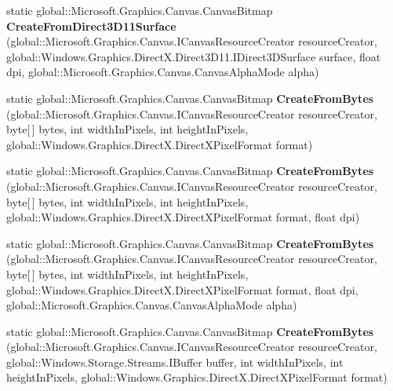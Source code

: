 \begin{DoxyCompactItemize}
static global\+::\+Microsoft.\+Graphics.\+Canvas.\+Canvas\+Bitmap {\bfseries Create\+From\+Direct3\+D11\+Surface} (global\+::\+Microsoft.\+Graphics.\+Canvas.\+I\+Canvas\+Resource\+Creator resource\+Creator, global\+::\+Windows.\+Graphics.\+Direct\+X.\+Direct3\+D11.\+I\+Direct3\+D\+Surface surface, float dpi, global\+::\+Microsoft.\+Graphics.\+Canvas.\+Canvas\+Alpha\+Mode alpha)
\item 
\mbox{\label{class_microsoft_1_1_graphics_1_1_canvas_1_1_canvas_bitmap_a0348f1385bf9b0fc99f3bd0a55c0ae0a}} 
static global\+::\+Microsoft.\+Graphics.\+Canvas.\+Canvas\+Bitmap {\bfseries Create\+From\+Bytes} (global\+::\+Microsoft.\+Graphics.\+Canvas.\+I\+Canvas\+Resource\+Creator resource\+Creator, byte\mbox{[}$\,$\mbox{]} bytes, int width\+In\+Pixels, int height\+In\+Pixels, global\+::\+Windows.\+Graphics.\+Direct\+X.\+Direct\+X\+Pixel\+Format format)
\item 
\mbox{\label{class_microsoft_1_1_graphics_1_1_canvas_1_1_canvas_bitmap_a34eb9feffadf35700e66c251dd67d5fc}} 
static global\+::\+Microsoft.\+Graphics.\+Canvas.\+Canvas\+Bitmap {\bfseries Create\+From\+Bytes} (global\+::\+Microsoft.\+Graphics.\+Canvas.\+I\+Canvas\+Resource\+Creator resource\+Creator, byte\mbox{[}$\,$\mbox{]} bytes, int width\+In\+Pixels, int height\+In\+Pixels, global\+::\+Windows.\+Graphics.\+Direct\+X.\+Direct\+X\+Pixel\+Format format, float dpi)
\item 
\mbox{\label{class_microsoft_1_1_graphics_1_1_canvas_1_1_canvas_bitmap_a9681e1d684ee6e674d7512d2874c8f1b}} 
static global\+::\+Microsoft.\+Graphics.\+Canvas.\+Canvas\+Bitmap {\bfseries Create\+From\+Bytes} (global\+::\+Microsoft.\+Graphics.\+Canvas.\+I\+Canvas\+Resource\+Creator resource\+Creator, byte\mbox{[}$\,$\mbox{]} bytes, int width\+In\+Pixels, int height\+In\+Pixels, global\+::\+Windows.\+Graphics.\+Direct\+X.\+Direct\+X\+Pixel\+Format format, float dpi, global\+::\+Microsoft.\+Graphics.\+Canvas.\+Canvas\+Alpha\+Mode alpha)
\item 
\mbox{\label{class_microsoft_1_1_graphics_1_1_canvas_1_1_canvas_bitmap_a2168a3d89e47f661342d1550456b8f68}} 
static global\+::\+Microsoft.\+Graphics.\+Canvas.\+Canvas\+Bitmap {\bfseries Create\+From\+Bytes} (global\+::\+Microsoft.\+Graphics.\+Canvas.\+I\+Canvas\+Resource\+Creator resource\+Creator, global\+::\+Windows.\+Storage.\+Streams.\+I\+Buffer buffer, int width\+In\+Pixels, int height\+In\+Pixels, global\+::\+Windows.\+Graphics.\+Direct\+X.\+Direct\+X\+Pixel\+Format format)

\end{DoxyCompactItemize}
